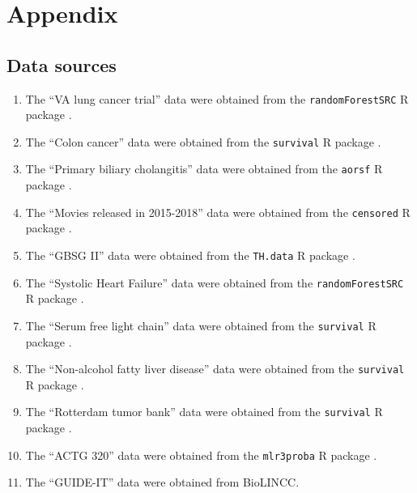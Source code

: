 \documentclass[12pt]{article}\usepackage[]{graphicx}\usepackage[]{xcolor}
\begin{document}
\appendix

\section*{Appendix}
\captionsetup{labelformat=AppendixTables}
\setcounter{table}{0}

\subsection*{Data sources}




\begin{enumerate}

 \item The ``VA lung cancer trial'' data \citep{kalbfleisch2011statistical} were obtained from the \texttt{randomForestSRC} R package \citep{randomForestSRC}. 
 \item The ``Colon cancer'' data \citep{moertel1995fluorouracil} were obtained from the \texttt{survival} R package \citep{survival}. 
 \item The ``Primary biliary cholangitis'' data \citep{therneau2000cox} were obtained from the \texttt{aorsf} R package \citep{aorsf}. 
 \item The ``Movies released in 2015-2018'' data  were obtained from the \texttt{censored} R package \citep{censored}. 
 \item The ``GBSG II'' data \citep{schumacher1994rauschecker} were obtained from the \texttt{TH.data} R package \citep{TH.data}. 
 \item The ``Systolic Heart Failure'' data \citep{hsich2011identifying} were obtained from the \texttt{randomForestSRC} R package \citep{randomForestSRC}. 
 \item The ``Serum free light chain'' data \citep{dispenzieri2012use, kyle2006prevalence} were obtained from the \texttt{survival} R package \citep{survival}. 
 \item The ``Non-alcohol fatty liver disease'' data \citep{allen2018nonalcoholic} were obtained from the \texttt{survival} R package \citep{survival}. 
 \item The ``Rotterdam tumor bank'' data \citep{royston2013external} were obtained from the \texttt{survival} R package \citep{survival}. 
 \item The ``ACTG 320'' data \citep{hosmer2002applied} were obtained from the \texttt{mlr3proba} R package \citep{mlr3proba}. 
 \item The ``GUIDE-IT'' data \citep{felker2017effect} were obtained from BioLINCC. 

\end{enumerate}
\end{document}
